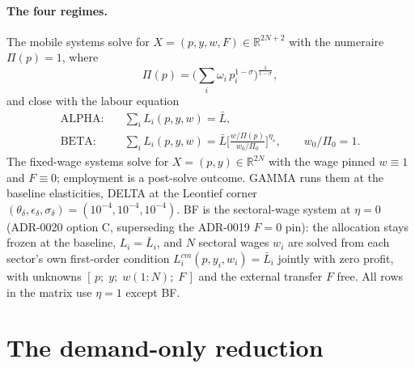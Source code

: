 \documentclass[11pt]{article}
\numberwithin{equation}{section}
\newcommand{\Lbar}{\bar{L}}
\begin{document}
\paragraph{The four regimes.} The mobile systems solve for
$X = (p, y, w, F) \in \mathbb{R}^{2N+2}$ with the numeraire
$\Pi(p) = 1$, where
\begin{equation}
\Pi(p) = \Big( \textstyle\sum_i \omega_i\, p_i^{1-\sigma}
   \Big)^{\frac{1}{1-\sigma}},
\label{eq:cpi}
\end{equation}
and close with the labour equation
\begin{align}
\text{ALPHA:}\quad & \textstyle\sum_i L_i(p,y,w) = \Lbar,
\label{eq:alpha}\\
\text{BETA:}\quad & \textstyle\sum_i L_i(p,y,w)
   = \Lbar \Big[ \frac{w/\Pi(p)}{w_0/\Pi_0} \Big]^{\eta_s},
\qquad w_0/\Pi_0 = 1.
\label{eq:beta}
\end{align}
The fixed-wage systems solve for $X = (p, y) \in \mathbb{R}^{2N}$ with the
wage pinned $w \equiv 1$ and $F \equiv 0$; employment is a post-solve
outcome. GAMMA runs them at the baseline elasticities, DELTA at the Leontief
corner $(\theta_\delta,\epsilon_\delta,\sigma_\delta) = (10^{-4},10^{-4},
10^{-4})$. \textcolor{revisionV1}{BF is the sectoral-wage system at
$\eta = 0$ (ADR-0020 option C, superseding the ADR-0019 $F = 0$ pin): the
allocation stays frozen at the baseline, $L_i = \bar{L}_i$, and $N$ sectoral
wages $w_i$ are solved from each sector's own first-order condition
$L^{cm}_i(p, y_i, w_i) = \bar{L}_i$ jointly with zero profit, with unknowns
$[\,p;\; y;\; w(1{:}N);\; F\,]$ and the external transfer $F$ free.} All rows
in the matrix use $\eta = 1$ except BF.

\section{The demand-only reduction}\label{sec:reduction}
\end{document}
